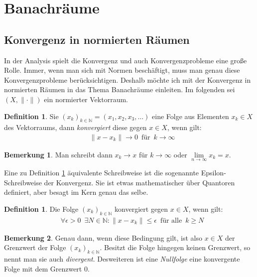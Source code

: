\documentclass[10pt,a4paper]{article}
\theoremstyle{plain}
\theoremstyle{definition}
\newtheorem{definition}[satz]{Definition}
\newenvironment{dfi}{\begin{shaded}\begin{definition}}{\end{definition}\end{shaded}}
\theoremstyle{nonumberplain}
\newtheorem{bemerkung}{Bemerkung}
\newenvironment{bem}{\begin{bemerkung}}{\end{bemerkung}}
\newcommand{\N}{\mathbb{N}}
\begin{document}
\section{Banachräume}
\subsection{Konvergenz in normierten Räumen}

In der Analysis spielt die Konvergenz und auch Konvergenzprobleme eine große Rolle. Immer, wenn man sich mit Normen beschäftigt, muss man genau diese Konvergenzprobleme berücksichtigen. Deshalb möchte ich mit der Konvergenz in normierten Räumen in das Thema Banachräume einleiten. Im folgenden sei $(X,\|\cdot\|)$ ein normierter Vektorraum.
\begin{dfi}
\label{konv}
Sie ${(x_k)}_{k \in \N} = (x_1, x_2, x_3, . . .)$ eine Folge aus Elementen $x_k \in X$ des Vektorraums, dann \textit{konvergiert} diese gegen $x \in X$, wenn gilt:
\begin{align*}
& \|x - x_k\| \rightarrow 0 \enspace \text{für} \enspace k \rightarrow \infty
\end{align*}
\end{dfi}
\begin{bem}
Man schreibt dann $x_k \rightarrow x$ für $k \rightarrow \infty$ oder $\lim\limits_{n \to \infty}{x_k} = x$.
\end{bem}
Eine zu Definition  \hyperref[konv]{\ref*{konv}} äquivalente Schreibweise ist die sogenannte Epsilon-Schreibweise der Konvergenz. Sie ist etwas mathematischer über Quantoren definiert, aber besagt im Kern genau das selbe.
\begin{dfi}
\label{konv_eps}
 Die Folge ${(x_k)}_{k \in \N}$ konvergiert gegen $x \in X$, wenn gilt:
\begin{align*}
& \forall \epsilon > 0 \enspace \exists N \in \N : \|x - x_k\| \leq \epsilon \enspace \text{für alle} \enspace k \geq N
\end{align*}
\end{dfi}
\begin{bem}
Genau dann, wenn diese Bedingung gilt, ist also $x \in X$ der Grenzwert der Folge ${(x_k)}_{k \in \N}$. Besitzt die Folge hingegen keinen Grenzwert, so nennt man sie auch \textit{divergent}. Desweiteren ist eine \textit{Nullfolge} eine konvergente Folge mit dem Grenzwert 0.
\end{bem}
\end{document}
